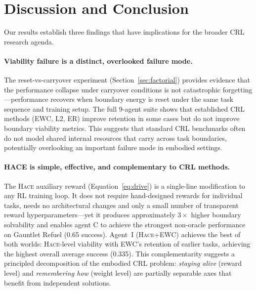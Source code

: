 \documentclass[sigplan,10pt]{acmart}
\newcommand{\hace}{\textsc{Hace}}
\begin{document}
\section{Discussion and Conclusion}
\label{sec:discussion}

Our results establish three findings that have implications for the
broader CRL research agenda.

\paragraph{Viability failure is a distinct, overlooked failure mode.}
The reset-vs-carryover experiment (Section~\ref{sec:factorial})
provides evidence that the performance collapse under carryover
conditions is not catastrophic forgetting---performance recovers when
boundary energy is reset under the same task sequence and training setup.
The full 9-agent suite shows that established CRL methods (EWC,
L2, ER) improve retention in some cases but do not improve boundary
viability metrics.
This suggests that standard CRL benchmarks often do not model shared
internal resources that carry across task boundaries, potentially
overlooking an important failure mode in embodied settings.

\paragraph{HACE is simple, effective, and complementary to CRL methods.}
The \hace{} auxiliary reward (Equation~\ref{eq:drive}) is a single-line
modification to any RL training loop.  It does not require hand-designed
rewards for individual tasks, needs no architectural changes and only a
small number of transparent reward hyperparameters---yet it
produces approximately $3\times$ higher boundary solvability and enables
agent C to achieve the strongest non-oracle performance on Gauntlet
Refuel (0.65 success).
Agent~I (\hace{}+EWC) achieves the best of both worlds: \hace{}-level
viability with EWC's retention of earlier tasks, achieving the highest
overall average success (0.335).  This complementarity suggests a
principled decomposition of the embodied CRL problem: \emph{staying
alive} (reward level) and \emph{remembering how} (weight level) are
partially separable axes that benefit from independent solutions.
\end{document}
